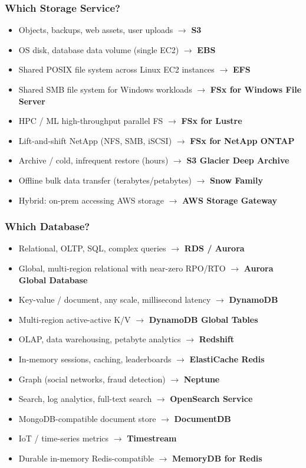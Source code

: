 \subsubsection{Which Storage Service?}

\begin{keyfacts}
\begin{itemize}
  \item Objects, backups, web assets, user uploads $\to$ \textbf{S3}
  \item OS disk, database data volume (single EC2) $\to$ \textbf{EBS}
  \item Shared POSIX file system across Linux EC2 instances $\to$ \textbf{EFS}
  \item Shared SMB file system for Windows workloads $\to$ \textbf{FSx for Windows File Server}
  \item HPC / ML high-throughput parallel FS $\to$ \textbf{FSx for Lustre}
  \item Lift-and-shift NetApp (NFS, SMB, iSCSI) $\to$ \textbf{FSx for NetApp ONTAP}
  \item Archive / cold, infrequent restore (hours) $\to$ \textbf{S3 Glacier Deep Archive}
  \item Offline bulk data transfer (terabytes/petabytes) $\to$ \textbf{Snow Family}
  \item Hybrid: on-prem accessing AWS storage $\to$ \textbf{AWS Storage Gateway}
\end{itemize}
\end{keyfacts}

\subsubsection{Which Database?}

\begin{keyfacts}
\begin{itemize}
  \item Relational, OLTP, SQL, complex queries $\to$ \textbf{RDS / Aurora}
  \item Global, multi-region relational with near-zero RPO/RTO $\to$ \textbf{Aurora Global Database}
  \item Key-value / document, any scale, millisecond latency $\to$ \textbf{DynamoDB}
  \item Multi-region active-active K/V $\to$ \textbf{DynamoDB Global Tables}
  \item OLAP, data warehousing, petabyte analytics $\to$ \textbf{Redshift}
  \item In-memory sessions, caching, leaderboards $\to$ \textbf{ElastiCache Redis}
  \item Graph (social networks, fraud detection) $\to$ \textbf{Neptune}
  \item Search, log analytics, full-text search $\to$ \textbf{OpenSearch Service}
  \item MongoDB-compatible document store $\to$ \textbf{DocumentDB}
  \item IoT / time-series metrics $\to$ \textbf{Timestream}
  \item Durable in-memory Redis-compatible $\to$ \textbf{MemoryDB for Redis}
\end{itemize}
\end{keyfacts}


